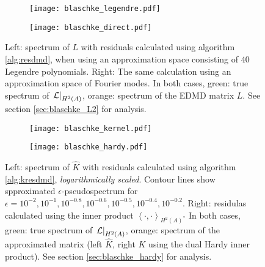 \begin{figure}
    \centering
    \begin{subfigure}{0.45\textwidth}
        \centering
        \texttt{[image: blaschke\_legendre.pdf]}
    \end{subfigure}
    \hfill
    \begin{subfigure}{0.45\textwidth}
        \centering
        \texttt{[image: blaschke\_direct.pdf]}
    \end{subfigure}
    \caption{
        Left: spectrum of $L$ with residuals calculated using algorithm \ref{alg:resdmd}, 
        when using an approximation space consisting of $40$ Legendre polynomials. 
        Right: The same calculation using an approximation space of Fourier modes. 
        In both cases, green: true spectrum of $\left. \mathcal{L} \right|_{H^2(A)}$, 
        orange: spectrum of the EDMD matrix $L$. See section \ref{sec:blaschke_L2} for 
        analysis. 
    }\label{fig:blaschke_L2}
\end{figure}

\begin{figure}
    \centering
    \begin{subfigure}{0.45\textwidth}
        \centering
        \texttt{[image: blaschke\_kernel.pdf]}
    \end{subfigure}
    \hfill
    \begin{subfigure}{0.45\textwidth}
        \centering
        \texttt{[image: blaschke\_hardy.pdf]}
    \end{subfigure}
    \caption{
        Left: spectrum of $\widehat{ K }$ with residuals calculated using algorithm \ref{alg:kresdmd}, 
        \emph{logarithmically scaled}. Contour lines show spproximated $\epsilon$-pseudospectrum 
        for $\epsilon = 10^{-2}, 10^{-1}, 10^{-0.8}, 10^{-0.6}, 10^{-0.5}, 10^{-0.4}, 10^{-0.2}$.  
        Right: residulas calculated using the inner product 
        $\left\langle \cdot, \cdot \right\rangle_{H^2 (A)^*}$
        In both cases, green: true spectrum of $\left. \mathcal{L} \right|_{H^2(A)}$, 
        orange: spectrum of the approximated matrix (left $\widehat{ K }$, right $K$ using 
        the dual Hardy inner product). See section \ref{sec:blaschke_hardy} for analysis. 
    }\label{fig:blaschke_other}
\end{figure}

